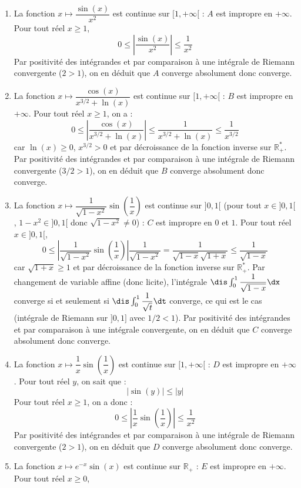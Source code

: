 \documentclass[a4paper,10pt]{report}
\begin{document}
\begin{enumerate}
\item La fonction $x \mapsto  \dfrac{\sin(x)}{x^2}$ est continue sur $[1, + \infty[$ : $A$ est impropre en $+ \infty$. Pour tout réel $x \geq 1$,
$$ 0 \leq \left\vert  \dfrac{\sin(x)}{x^2} \right\vert \leq \dfrac{1}{x^2}$$
Par positivité des intégrandes et par comparaison à une intégrale de Riemann convergente ($2>1$), on en déduit que $A$ converge absolument donc converge.
\item La fonction $x \mapsto  \dfrac{\cos(x)}{x^{3/2}+\ln(x)} $ est continue sur $[1, + \infty[$ : $B$ est impropre en $+ \infty$. Pour tout réel $x \geq 1$, on a :
$$ 0 \leq \left\vert \dfrac{\cos(x)}{x^{3/2}+\ln(x)} \right\vert \leq  \dfrac{1}{x^{3/2}+\ln(x)} \leq \dfrac{1}{x^{3/2}}$$
car $\ln(x) \geq 0$, $x^{3/2}>0$ et par décroissance de la fonction inverse sur $\mathbb{R}_+^{*}$. Par positivité des intégrandes et par comparaison à une intégrale de Riemann convergente ($3/2>1$), on en déduit que $B$ converge absolument donc converge.
\item La fonction $x \mapsto \dfrac{1}{\sqrt{1-x^2}} \sin \left(\dfrac{1}{x}\right) $ est continue sur $]0,1[$ (pour tout $x \in ]0,1[$, $1-x^2 \in ]0,1[$ donc $\sqrt{1-x^2} \neq 0$) : $C$ est impropre en $0$ et $1$. Pour tout réel $x \in ]0,1[$,
$$ 0 \leq \left\vert  \dfrac{1}{\sqrt{1-x^2}} \sin \left(\dfrac{1}{x}\right) \right\vert \dfrac{1}{\sqrt{1-x^2}} = \dfrac{1}{\sqrt{1-x}\sqrt{1+x}} \leq \dfrac{1}{\sqrt{1-x}}$$
car $\sqrt{1+x} \geq 1$ et par décroissance de la fonction inverse sur $\mathbb{R}_+^*$. Par changement de variable affine (donc licite), l'intégrale $\dis \int_0^1 \dfrac{1}{\sqrt{1-x}} \dx$ converge si et seulement si $\dis \int_0^1 \dfrac{1}{\sqrt{t}} \dt$ converge, ce qui est le cas (intégrale de Riemann sur $]0,1]$ avec $1/2<1$). Par positivité des intégrandes et par comparaison à une intégrale convergente, on en déduit que $C$ converge absolument donc converge.
\item La fonction $x \mapsto \dfrac{1}{x} \sin \left(\dfrac{1}{x}\right)$ est continue sur $[1, + \infty[$ : $D$ est impropre en $+ \infty$. Pour tout réel $y$, on sait que :
$$ \vert \sin(y) \vert \leq \vert y \vert$$
Pour tout réel $x \geq 1$, on a donc :
$$ 0 \leq \left\vert \dfrac{1}{x} \sin \left(\dfrac{1}{x}\right) \right\vert \leq \dfrac{1}{x^2}$$
Par positivité des intégrandes et par comparaison à une intégrale de Riemann convergente ($2>1$), on en déduit que $D$ converge absolument donc converge.
\item La fonction $x \mapsto e^{-x} \sin(x)$ est continue sur $\mathbb{R}_+$ : $E$ est impropre en $+ \infty$. Pour tout réel $x \geq 0$,

\end{enumerate}
\end{document}
